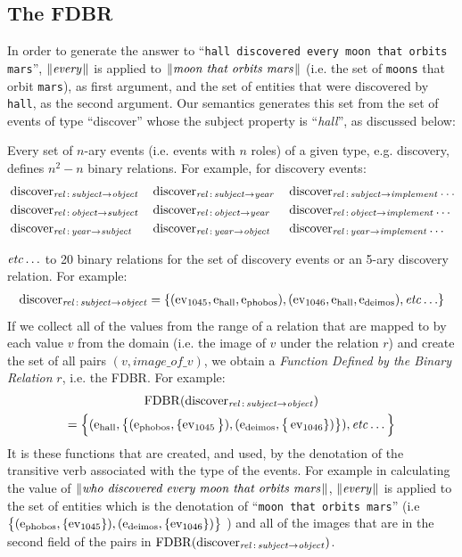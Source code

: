 \documentclass[../main.tex]{subfiles}
\begin{document}
\begin{refsection}
\subsection{The FDBR}
\label{webist2019journal:fdbr}

In order to generate the  answer to ``\texttt{hall discovered every moon that orbits mars}'', $\meaningof{every}$ is applied to $\meaningof{moon that orbits mars}$ (i.e. the set of \texttt{moons} that orbit \texttt{mars}), as first argument, and the set of entities  that were discovered by \texttt{hall}, as the second argument.
Our semantics generates this set from the set of events of type ``discover'' whose the subject property is ``\textit{hall}'', as discussed below:

Every set of $n$-ary events (i.e. events with $n$ roles) of a given type, e.g. discovery, defines $n^2 - n$ binary relations. For example, for discovery events:
\begin{alignat*}{3}
	&\relationn{discover}{subject}{object} &&\relationn{discover}{subject}{year} &&\relationn{discover}{subject}{implement} \dots \\
	&\relationn{discover}{object}{subject} &&\relationn{discover}{object}{year} &&\relationn{discover}{object}{implement} \dots \\
	&\relationn{discover}{year}{subject} &&\relationn{discover}{year}{object} &&\relationn{discover}{year}{implement} \dots
\end{alignat*}

\noindent $\etc$ to 20 binary relations for  the set of discovery events or an 5-ary discovery relation. For example:
\begin{multline*}
	\relationn{discover}{subject}{object} = \{(\event{1045}, \entity{hall}, \entity{phobos}), (\event{1046}, \entity{hall}, \entity{deimos}), \etc\}
\end{multline*}
If we collect all of the values from the range of a relation that are mapped to by each value $v$ from the domain (i.e. the image of $v$ under the relation $r$) and create the set of all pairs $(v, image\_of\_v)$, we obtain a {\em Function Defined by the Binary Relation} $r$, i.e. the FDBR. For example:
\begin{multline*}
	\FDBR{\relationn{discover}{subject}{object}} \\ = \Big\{ ( \entity{hall}, \big\{(\entity{phobos}, \{\event{1045}\big\}), (\entity{deimos}, \big\{\event{1046}\}) \big\}), \etc\Big\}
\end{multline*}
It is these functions that are created, and used, by the denotation of the transitive verb associated with the type of the events. For example in calculating the value of $\meaningof{who\ discovered\ every\ moon\ that\ orbits\ mars}$, $\meaningof{every}$ is applied to the set of entities which is the denotation of ``\texttt{moon that orbits mars}'' (i.e $\big\{ (\entity{phobos}, \{\event{1045}\}), \\ (\entity{deimos}, \{\event{1046}\})\big\}$ ) and all of the images that are in the second field of the pairs in $\FDBR{\relationn{discover}{subject}{object}}$.


\end{refsection}
\end{document}

